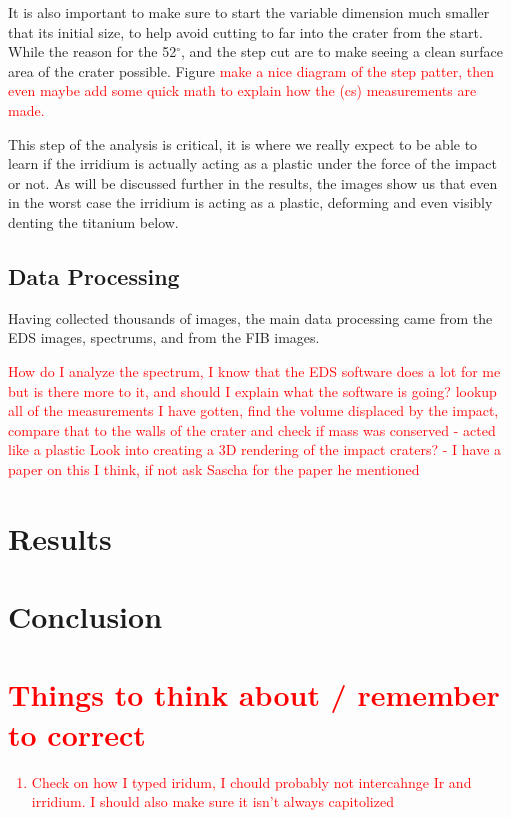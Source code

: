 \documentclass[review]{elsarticle}
\begin{document}
			It is also important to make sure to start the variable dimension much smaller that its initial size, to help avoid cutting to far into the crater from the start. While the 
			reason for the 52$^\circ$, and the step cut are to make seeing a clean surface area of the crater possible. Figure \textcolor{red}{make a nice diagram of the step patter,
			then even maybe add some quick math to explain how the (cs) measurements are made.} 

			This step of the analysis is critical, it is where we really expect to be able to learn if the irridium is actually acting as a plastic under the force of the impact or not. 
			As will be discussed further in the results, the images show us that even in the worst case the irridium is acting as a plastic, deforming and even visibly denting the titanium 
			below. 


		\subsection{Data Processing}
		Having collected thousands of images, the main data processing came from the EDS images, spectrums, and from the FIB images. 

		\textcolor{red}{How do I analyze the spectrum, I know that the EDS software does a lot for me but is there more to it, and should I explain what the software is going?}
		\textcolor{red}{lookup all of the measurements I have gotten, find the volume displaced by the impact, compare that to the walls of the crater and check if 
						mass was conserved - acted like a plastic}
		\textcolor{red}{Look into creating a 3D rendering of the impact craters? - I have a paper on this I think, if not ask Sascha for the paper he mentioned}



 
	\section{Results}
		



	\section{Conclusion}




	
	
	\section{\textcolor{red}{Things to think about / remember to correct}}
		\textcolor{red}{
			\begin{enumerate}
				\item Check on how I typed iridum, I chould probably not intercahnge Ir and irridium. I should also make sure it isn't always capitolized
			\end{enumerate}
		}
\end{document}
